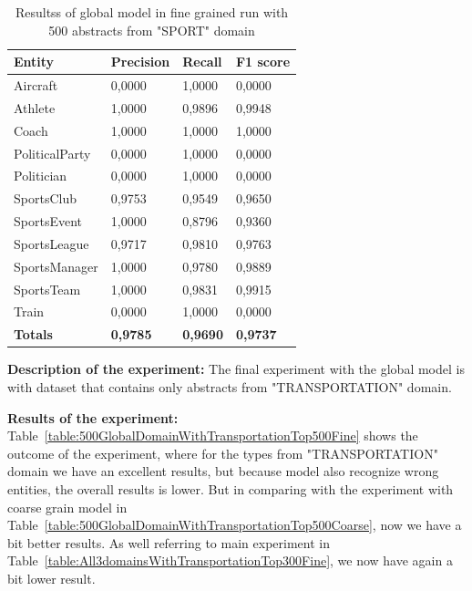 \documentclass[thesis=M,english]{FITthesis}[2018/05/30]
\begin{document}
	\begin{table}[H]\centering
		\begin{tabular}{|l|l|l|l|}
			\hline {\textbf{Entity}} & {\textbf{Precision}} & {\textbf{Recall}} & {\textbf{F1 score}}\\\hline
				Aircraft & 0,0000 & 1,0000 & 0,0000\\
				Athlete & 1,0000 & 0,9896 & 0,9948\\
				Coach & 1,0000 & 1,0000 & 1,0000\\
				PoliticalParty & 0,0000 & 1,0000 & 0,0000\\
				Politician & 0,0000 & 1,0000 & 0,0000\\
				SportsClub & 0,9753 & 0,9549 & 0,9650\\
				SportsEvent & 1,0000 & 0,8796 & 0,9360\\
				SportsLeague & 0,9717 & 0,9810 & 0,9763\\
				SportsManager & 1,0000 & 0,9780 & 0,9889\\				
				SportsTeam & 1,0000 & 0,9831 & 0,9915\\
				Train & 0,0000 & 1,0000 & 0,0000\\\hline
				\textbf{Totals} & \textbf{0,9785} & \textbf{0,9690} & \textbf{0,9737}\\\hline
		\end{tabular}
		\caption{Resultss of global model in fine grained run with 500 abstracts from "SPORT" domain \label{table:500GlobalDomainWithSportTop500Fine}}
	\end{table}	

	\textbf{Description of the experiment:} The final experiment with the global model is with dataset that contains only abstracts from "TRANSPORTATION" domain.

	\textbf{Results of the experiment:} Table~\ref{table:500GlobalDomainWithTransportationTop500Fine} shows the outcome of the experiment, where for the types from "TRANSPORTATION" domain we have an excellent results, but because model also recognize wrong entities, the overall results is lower. But in comparing with the experiment with coarse grain model in Table~\ref{table:500GlobalDomainWithTransportationTop500Coarse}, now we have a bit better results. As well referring to main experiment in Table~\ref{table:All3domainsWithTransportationTop300Fine}, we now have again a bit lower result.
\end{document}
